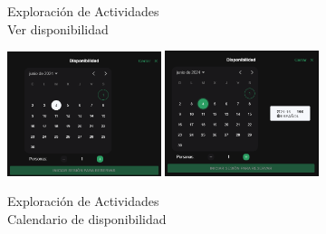 \begin{figure}[H]
\begin{minipage}{0.45\textwidth}
		\caption{Exploración de Actividades \\ Ver disponibilidad}
		\label{fig:ver-disponibilidad}
	\end{minipage}
\end{figure}

\begin{figure}[H]
	\centering
	\includegraphics[width=0.4\textwidth]{7-Construccion/Manuales/web/disponibilidad sin.png}
	\includegraphics[width=0.4\textwidth]{7-Construccion/Manuales/web/disponibilidad selec dia.png}
	\caption{Exploración de Actividades \\ Calendario de disponibilidad}
	\label{fig:disponibilidad}
\end{figure}

